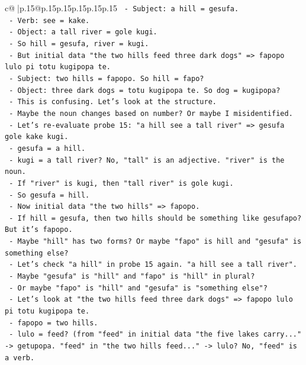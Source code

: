 \documentclass{article}
\begin{document}
{\begin{supertabular}{c@{$\;$}|p{.15\linewidth}@{}p{.15\linewidth}p{.15\linewidth}p{.15\linewidth}p{.15\linewidth}p{.15\linewidth}}
{{{\texttt{    {-} Subject: a hill = gesufa.} \\
\texttt{    {-} Verb: see = kake.} \\
\texttt{    {-} Object: a tall river = gole kugi.} \\
\texttt{    {-} So hill = gesufa, river = kugi.} \\
\texttt{  {-} But initial data "the two hills feed three dark dogs" => fapopo lulo pi totu kugipopa te.} \\
\texttt{    {-} Subject: two hills = fapopo. So hill = fapo?} \\
\texttt{    {-} Object: three dark dogs = totu kugipopa te. So dog = kugipopa?} \\
\texttt{    {-} This is confusing. Let's look at the structure.} \\
\texttt{    {-} Maybe the noun changes based on number? Or maybe I misidentified.} \\
\texttt{    {-} Let's re{-}evaluate probe 15: "a hill see a tall river" => gesufa gole kake kugi.} \\
\texttt{      {-} gesufa = a hill.} \\
\texttt{      {-} kugi = a tall river? No, "tall" is an adjective. "river" is the noun.} \\
\texttt{      {-} If "river" is kugi, then "tall river" is gole kugi.} \\
\texttt{      {-} So gesufa = hill.} \\
\texttt{    {-} Now initial data "the two hills" => fapopo.} \\
\texttt{      {-} If hill = gesufa, then two hills should be something like gesufapo? But it's fapopo.} \\
\texttt{      {-} Maybe "hill" has two forms? Or maybe "fapo" is hill and "gesufa" is something else?} \\
\texttt{      {-} Let's check "a hill" in probe 15 again. "a hill see a tall river".} \\
\texttt{      {-} Maybe "gesufa" is "hill" and "fapo" is "hill" in plural?} \\
\texttt{      {-} Or maybe "fapo" is "hill" and "gesufa" is "something else"?} \\
\texttt{      {-} Let's look at "the two hills feed three dark dogs" => fapopo lulo pi totu kugipopa te.} \\
\texttt{        {-} fapopo = two hills.} \\
\texttt{        {-} lulo = feed? (from "feed" in initial data "the five lakes carry..." {-}> getupopa. "feed" in "the two hills feed..." {-}> lulo? No, "feed" is a verb.} \\
}}}
\end{supertabular}}
\end{document}
